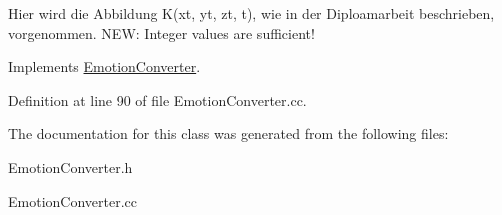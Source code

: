 \-Hier wird die \-Abbildung \-K(xt, yt, zt, t), wie in der \-Diploamarbeit beschrieben, vorgenommen. \-N\-E\-W\-: \-Integer values are sufficient! 

\-Implements \hyperlink{class_emotion_converter}{\-Emotion\-Converter}.



\-Definition at line 90 of file \-Emotion\-Converter.\-cc.



\-The documentation for this class was generated from the following files\-:\begin{DoxyCompactItemize}
\item 
\-Emotion\-Converter.\-h\item 
\-Emotion\-Converter.\-cc\end{DoxyCompactItemize}
